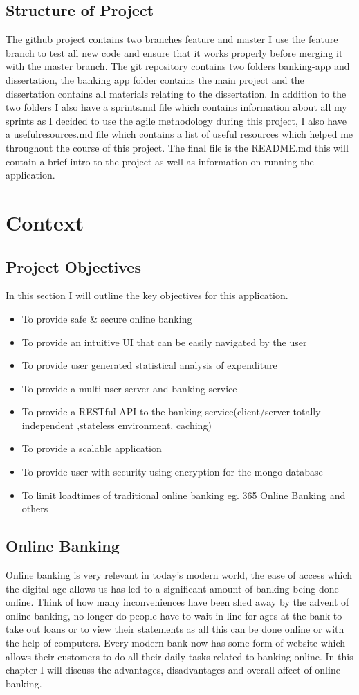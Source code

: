 \section{Structure of Project}
The \href{https://github.com/Ultan-Kearns/AppliedProject}{github project} contains two branches feature and master
I use the feature branch to test all new code and ensure that it works properly before merging it with the master
branch.  The git repository contains two folders banking-app and dissertation, the banking app folder contains the
main project and the dissertation contains all materials relating to the dissertation. In addition to the two folders
I also have a sprints.md file which contains information about all my sprints as I decided to use the agile methodology during this project, I also have a usefulresources.md file which contains a list of useful resources which helped me throughout the course of this project.  The final file is the README.md this will contain a brief intro to the project as well as information on running the application.
\chapter{Context}
\section{Project Objectives}
In this section I will outline the key objectives for this application.
\begin{itemize}
  \item To provide safe \& secure online banking
  \item To provide an intuitive UI that can be easily navigated by the user
  \item To provide user generated statistical analysis of expenditure
  \item To provide a multi-user server and banking service
  \item To provide a RESTful API to the banking service(client/server totally independent
  ,stateless environment, caching)
  \item To provide a scalable application
  \item To provide user with security using encryption for the mongo database
  \item To limit loadtimes of traditional online banking eg. 365 Online Banking and others
\end{itemize}
\section{Online Banking}
Online banking is very relevant in today's modern world, the ease of access which
the digital age allows us has led to a significant amount of banking being done
online.  Think of how many inconveniences have been shed away by the advent of online
banking, no longer do people have to wait in line for ages at the bank to take out loans
or to view their statements as all this can be done online or with the help of computers.
Every modern bank now has some form of website which allows their customers to do
all their daily tasks related to banking online.  In this chapter I will discuss the
advantages, disadvantages and overall affect of online banking.
